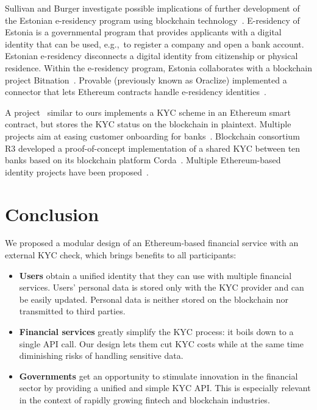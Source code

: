 Sullivan and Burger investigate possible implications of further development of the Estonian e-residency program using blockchain technology~\cite{Sullivan2017}.
E-residency of Estonia is a governmental program that provides applicants with a digital identity that can be used, e.g.,~to register a company and open a bank account.
Estonian e-residency disconnects a digital identity from citizenship or physical residence.
Within the e-residency program, Estonia collaborates with a blockchain project Bitnation~\cite{Bitnation15, Estonia15}.
Provable (previously known as Oraclize) implemented a connector that lets Ethereum contracts handle e-residency identities~\cite{Provable}.

A project~\cite{Ohtamaa2016} similar to ours implements a KYC scheme in an Ethereum smart contract, but stores the KYC status on the blockchain in plaintext.
Multiple projects aim at easing customer onboarding for banks~\cite{CambridgeBlockchain, KycChain, SnapSwap, Tradle}.
Blockchain consortium R3 developed a proof-of-concept implementation of a shared KYC between ten banks based on its blockchain platform Corda~\cite{Allison2016}.
Multiple Ethereum-based identity projects have been proposed~\cite{Mesropyan2017, Sovrin, Uport}.



\section{Conclusion}

We proposed a modular design of an Ethereum-based financial service with an external KYC check, which brings benefits to all participants:

\begin{itemize}
	\item \textbf{Users} obtain a unified identity that they can use with multiple financial services.
	Users' personal data is stored only with the KYC provider and can be easily updated.
	Personal data is neither stored on the blockchain nor transmitted to third parties.
	\item \textbf{Financial services} greatly simplify the KYC process: it boils down to a single API call.
	Our design lets them cut KYC costs while at the same time diminishing risks of handling sensitive data.
	\item \textbf{Governments} get an opportunity to stimulate innovation in the financial sector by providing a unified and simple KYC API\@.
	This is especially relevant in the context of rapidly growing fintech and blockchain industries.
\end{itemize}

